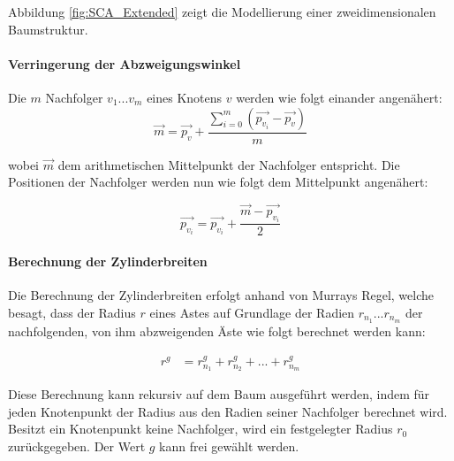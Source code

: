 Abbildung \ref{fig:SCA_Extended} zeigt die Modellierung einer zweidimensionalen Baumstruktur.

\paragraph{Verringerung der Abzweigungswinkel} \label{par:VerringerungAbzweigungswinkel}

Die $m$ Nachfolger $v_{1} ... v_{m}$ eines Knotens $v$ werden wie folgt einander angenähert:
\begin{equation}
\overrightarrow{m} = \overrightarrow{p_v} + \dfrac{\sum_{i=0}^{m} (\overrightarrow{p_{v_i}} - \overrightarrow{p_v})}{m}
\end{equation}

wobei $\overrightarrow{m}$ dem arithmetischen Mittelpunkt der Nachfolger entspricht. Die Positionen der Nachfolger werden nun wie folgt dem Mittelpunkt angenähert:

\begin{equation}
\overrightarrow{p_{v_i}} = \overrightarrow{p_{v_i}} + \dfrac{\overrightarrow{m} -\overrightarrow{p_{v_i}}}{2}
\end{equation}

\cite[S.2]{SpaceColonizationAlgorithm:07}


\paragraph{Berechnung der Zylinderbreiten}

Die Berechnung der Zylinderbreiten erfolgt anhand von Murrays Regel, welche besagt, dass der Radius $r$ eines Astes auf Grundlage der Radien $r_{n_1}...r_{n_m}$ der nachfolgenden, von ihm abzweigenden Äste wie folgt berechnet werden kann: 

\begin{equation}
\begin{array}{ll}
r^g & = r_{n_1}^g + r_{n_2}^g + ... + r_{n_m}^g 
\end{array}
\label{eq:Radiusberechnung}
\end{equation} 

Diese Berechnung kann rekursiv auf dem Baum ausgeführt werden, indem für jeden Knotenpunkt der Radius aus den Radien seiner Nachfolger berechnet wird. Besitzt ein Knotenpunkt keine Nachfolger, wird ein festgelegter Radius $r_0$ zurückgegeben. Der Wert $g$ kann frei gewählt werden. \cite[S.5]{LeafVenation:05}

